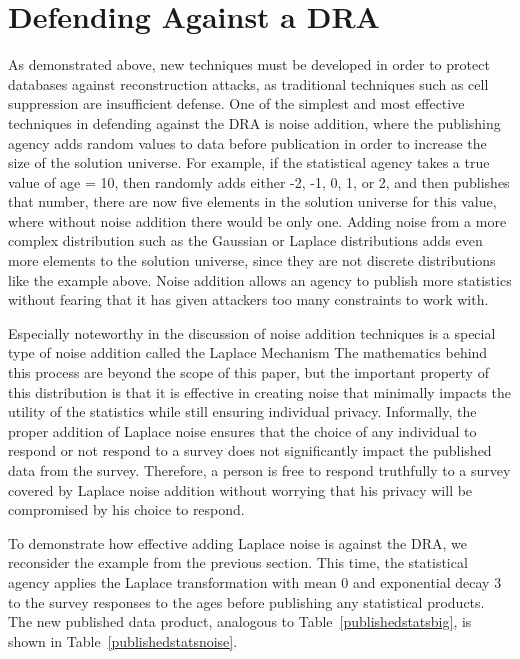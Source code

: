 \documentclass[5p,times,11pt]{elsarticle}
\begin{document}
\pagebreak

\section{Defending Against a DRA}
As demonstrated above, new techniques must be developed in
order to protect databases against reconstruction attacks, as traditional techniques such as cell suppression are insufficient defense. One of the simplest and most effective techniques in defending against the DRA is noise addition, where the publishing agency adds random values to data before publication in order to increase the size of the solution universe. For example, if the statistical agency takes a true value of age = 10, then randomly adds either -2, -1, 0, 1, or 2, and then publishes that number, there are now five elements in the solution universe for this value, where without noise addition there would be only one. Adding noise from a more complex distribution such as the Gaussian or Laplace distributions adds even more elements to the solution universe, since they are not discrete distributions like the example above. Noise addition allows an agency to publish more statistics without fearing that it has given attackers too many constraints to work with.

Especially noteworthy in the discussion of noise addition techniques is a special type of noise addition called the Laplace Mechanism \cite{Dwork:2006:CNS:2180286.2180305}
The mathematics behind this process are beyond the scope of this paper, but the important property of this distribution is that it is effective in creating noise that minimally impacts the utility of the statistics while still ensuring individual privacy. Informally, the proper addition of Laplace noise ensures that the choice of any individual to respond or not respond to a survey does not significantly impact the published data from the survey. Therefore, a person is free to respond truthfully to a survey covered by Laplace noise addition without worrying that his privacy will be compromised by his choice to respond.

To demonstrate how effective adding Laplace noise is against the DRA, we reconsider the example from the previous section. This time, the statistical agency applies the Laplace transformation with mean 0 and exponential decay 3 to the survey responses to the ages before publishing any statistical products. The new published data product, analogous to Table~\ref{publishedstatsbig}, is shown in Table~\ref{publishedstatsnoise}.
\end{document}
